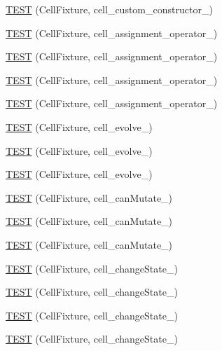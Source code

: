 \begin{DoxyCompactItemize}
\item 
\hyperlink{TestLife_8c_09_09_afad14577d2166ba390c3597445d9c323}{T\-E\-S\-T} (Cell\-Fixture, cell\-\_\-custom\-\_\-constructor\-\_)
\item 
\hyperlink{TestLife_8c_09_09_ab5c3cf0b256379e78a37d26915d8ac12}{T\-E\-S\-T} (Cell\-Fixture, cell\-\_\-assignment\-\_\-operator\-\_)
\item 
\hyperlink{TestLife_8c_09_09_a40752c5e203cb85cd850cca5917e33da}{T\-E\-S\-T} (Cell\-Fixture, cell\-\_\-assignment\-\_\-operator\-\_)
\item 
\hyperlink{TestLife_8c_09_09_a0d94165bddd6dc6db849355ab8d20b14}{T\-E\-S\-T} (Cell\-Fixture, cell\-\_\-assignment\-\_\-operator\-\_)
\item 
\hyperlink{TestLife_8c_09_09_adadc23d489b7b4ddfd26a890ed8a5a41}{T\-E\-S\-T} (Cell\-Fixture, cell\-\_\-assignment\-\_\-operator\-\_)
\item 
\hyperlink{TestLife_8c_09_09_a71e01d5c299761ea54137ec260dd300b}{T\-E\-S\-T} (Cell\-Fixture, cell\-\_\-evolve\-\_)
\item 
\hyperlink{TestLife_8c_09_09_ae73424fa1281ec53f81cb0684bbef79b}{T\-E\-S\-T} (Cell\-Fixture, cell\-\_\-evolve\-\_)
\item 
\hyperlink{TestLife_8c_09_09_a16fdbdfc11b2031b8a42d2b980eed204}{T\-E\-S\-T} (Cell\-Fixture, cell\-\_\-evolve\-\_)
\item 
\hyperlink{TestLife_8c_09_09_a92544f6316786e1fb23f78338afb8823}{T\-E\-S\-T} (Cell\-Fixture, cell\-\_\-can\-Mutate\-\_)
\item 
\hyperlink{TestLife_8c_09_09_ac1ae05c2f1233c068b3db6ddc822dc2c}{T\-E\-S\-T} (Cell\-Fixture, cell\-\_\-can\-Mutate\-\_)
\item 
\hyperlink{TestLife_8c_09_09_a25eefc995c4a0737019fc5a48958e1e7}{T\-E\-S\-T} (Cell\-Fixture, cell\-\_\-can\-Mutate\-\_)
\item 
\hyperlink{TestLife_8c_09_09_ab3e9cb0299c6cc0a061f7ed029cf8bc4}{T\-E\-S\-T} (Cell\-Fixture, cell\-\_\-change\-State\-\_)
\item 
\hyperlink{TestLife_8c_09_09_a9a541e160c9b320c223d651604560bd4}{T\-E\-S\-T} (Cell\-Fixture, cell\-\_\-change\-State\-\_)
\item 
\hyperlink{TestLife_8c_09_09_afca6c2555df9490bb1272abe65a18897}{T\-E\-S\-T} (Cell\-Fixture, cell\-\_\-change\-State\-\_)
\item 
\hyperlink{TestLife_8c_09_09_a6bbe0000d4b7d4e0c06f39ebb706fd12}{T\-E\-S\-T} (Cell\-Fixture, cell\-\_\-change\-State\-\_)
\item 

\end{DoxyCompactItemize}
